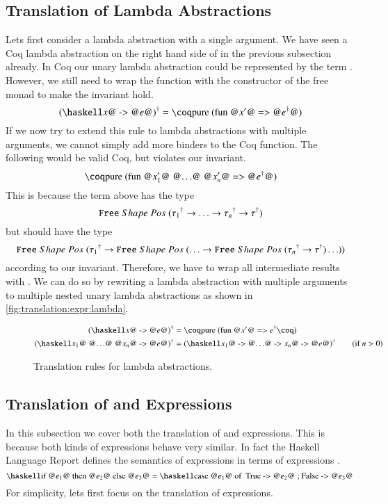 \subsection{Translation of Lambda Abstractions} \label{sec:translation:expr:lambda}
Lets first consider a lambda abstraction  with a single argument.
We have seen a Coq lambda abstraction on the right hand side of \coq{>>=} in the previous subsection already.
In Coq our unary lambda abstraction could be represented by the term .
However, we still need to wrap the function with the  constructor of the free monad to make the invariant hold.
\[
  \toCoq{(\haskellM{\@$x$@ -> @$e$@})} = \coqM{pure (fun @$x'$@ => @$\toCoqX{e}$@)}
\]
If we now try to extend this rule to lambda abstractions  with multiple arguments, we cannot simply add more binders to the Coq function.
The following would be valid Coq, but violates our invariant.
\[
  \coqM{pure (fun @$x_1'$@ @$\ldots$@ @$x_n'$@ => @$\toCoqX{e}$@)}
\]
This is because the term above has the type
\[
  {\texttt{Free}}\;Shape\;Pos\;{({\tau_1}^{\dagger}
    \rightarrow \ldots
    \rightarrow {\tau_n}^{\dagger}
    \rightarrow {\tau}^{\dagger})}
\]
but should have the type
\[
  {\texttt{Free}}\;Shape\;Pos\;{({\tau_1}^{\dagger}
    \rightarrow {\texttt{Free}}\;Shape\;Pos\;{(\ldots
    \rightarrow {\texttt{Free}}\;Shape\;Pos\;{({\tau_n}^{\dagger}
    \rightarrow {\tau}^{\dagger})} \ldots)})}
\]
according to our invariant.
Therefore, we have to wrap all intermediate results with .
We can do so by rewriting a lambda abstraction with multiple arguments to multiple nested unary lambda abstractions as shown in \autoref{fig:translation:expr:lambda}.

\begin{figure}[H]
  \begin{align*}
    \toCoq{(\haskellM{\@$x$@ -> @$e$@})} &= \coqM{pure (fun @$x'$@ =>}\;\toCoq{e}\coqM{)} \\
    \toCoq{(\haskellM{\@$x_1$@ @$\ldots$@ @$x_n$@ -> @$e$@})} &= \toCoq{(\haskellM{\@$x_1$@ -> @$\ldots$@ -> \@$x_n$@ -> @$e$@})}
    \tag{if $n > 0$}
  \end{align*}
  \caption{Translation rules for lambda abstractions.}
  \label{fig:translation:expr:lambda}
\end{figure}

\subsection{Translation of  and  Expressions}
In this subsection we cover both the translation of  and  expressions.
This is because both kinds of expressions behave very similar.
In fact the Haskell Language Report defines the semantics of  expressions in terms of  expressions \cite[p.~20]{Marlow:2010}.
\[
  \haskellM{if @$e_1$@ then @$e_2$@ else @$e_3$@}
    = \haskellM{case @$e_1$@ of { True -> @$e_2$@ ; False -> @$e_3$@ }}
\]
For simplicity, lets first focus on the translation of  expressions.

